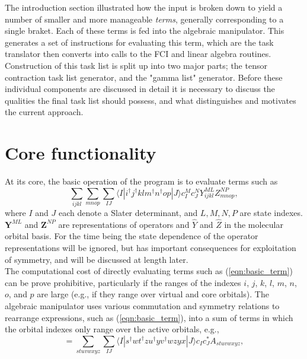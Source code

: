 \noindent The introduction section illustrated how the input is broken down to yield a number of smaller and more manageable \emph{terms}, 
generally corresponding to a single braket. Each of these terms is fed into the algebraic manipulator. This generates a set of instructions for
evaluating this term, which are the task translator then converts into calls to the FCI and linear algebra routines. Construction
of this task list is split up into two major parts; the tensor contraction task list generator, and the 
"gamma list" generator. Before these individual components are discussed in detail it is necessary to discuss the qualities 
the final task list should possess, and what distinguishes and motivates the current approach. \\

\section{Core functionality}
\noindent At its core, the basic operation of the program is to evaluate terms such as 
\begin{equation}
\sum_{ijkl}\sum_{mnop} \sum_{IJ} \langle I | i^{\dagger}j^{\dagger}klm^{\dagger}n^{\dagger}op | J \rangle c^{M}_{I} c_{J}^{N} Y^{ML}_{ijkl}Z^{NP}_{mnop},
\label{eqn:basic_term}
\end{equation}
where $I$ and $J$ each denote a Slater determinant, and $L,M,N,P$ are state
indexes.  $\mathbf{Y}^{ML}$ and $\mathbf{Z}^{NP}$ are representations of
operators and $\hat{Y}$ and $\hat{Z}$ in the molecular orbital basis. For the time being
the state dependence of the operator representations will be ignored, but has important consequences
for exploitation of symmetry, and will be discussed at length later. \\ 

\noindent The computational cost of directly evaluating terms such as (\ref{eqn:basic_term}) can be prove prohibitive,
particularly if the ranges of the indexes $i$, $j$, $k$, $l$, $m$, $n$, $o$, and $p$ are large (e.g., if they
range over virtual and core orbitals). The algebraic manipulator uses various commutation and symmetry relations
to rearrange expressions, such as (\ref{eqn:basic_term}), into a sum of terms in which
the orbital indexes only range over the active orbitals, e.g.,
\begin{equation*}
=\sum_{stuvwxyz} \sum_{IJ} \langle I | s^{\dagger}wt^{\dagger}zu^{\dagger}yv^{\dagger}wzyx | J \rangle c_{I} c^{*}_{J} A_{stuvwxyz},
\end{equation*}


